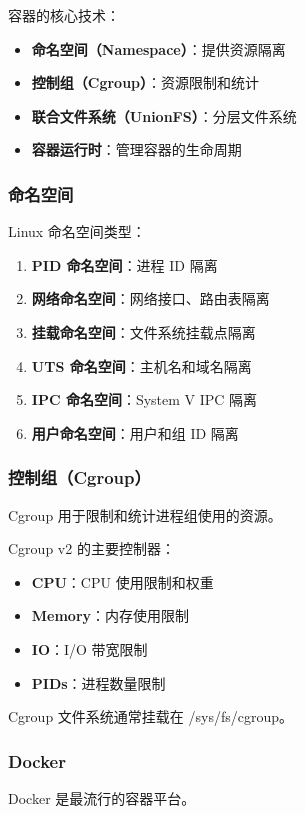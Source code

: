 容器的核心技术：
\begin{itemize}
  \item \textbf{命名空间（Namespace）}：提供资源隔离
  \item \textbf{控制组（Cgroup）}：资源限制和统计
  \item \textbf{联合文件系统（UnionFS）}：分层文件系统
  \item \textbf{容器运行时}：管理容器的生命周期
\end{itemize}

\subsubsection{命名空间}

Linux 命名空间类型：
\begin{enumerate}
  \item \textbf{PID 命名空间}：进程 ID 隔离
  \item \textbf{网络命名空间}：网络接口、路由表隔离
  \item \textbf{挂载命名空间}：文件系统挂载点隔离
  \item \textbf{UTS 命名空间}：主机名和域名隔离
  \item \textbf{IPC 命名空间}：System V IPC 隔离
  \item \textbf{用户命名空间}：用户和组 ID 隔离
\end{enumerate}

\subsubsection{控制组（Cgroup）}

Cgroup 用于限制和统计进程组使用的资源。

Cgroup v2 的主要控制器：
\begin{itemize}
  \item \textbf{CPU}：CPU 使用限制和权重
  \item \textbf{Memory}：内存使用限制
  \item \textbf{IO}：I/O 带宽限制
  \item \textbf{PIDs}：进程数量限制
\end{itemize}

Cgroup 文件系统通常挂载在 /sys/fs/cgroup。

\subsubsection{Docker}

Docker 是最流行的容器平台。

